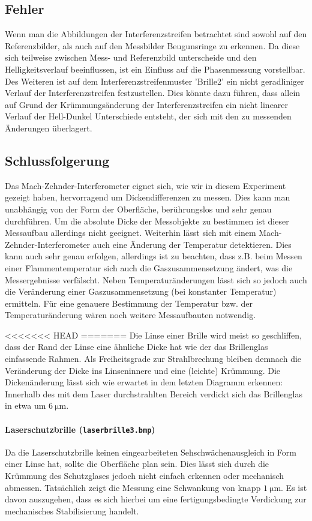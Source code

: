 \subsection{Fehler}
Wenn man die Abbildungen der Interferenzstreifen betrachtet sind sowohl auf den Referenzbilder, als auch auf den Messbilder Beugunsringe zu erkennen. Da diese sich teilweise zwischen Mess- und Referenzbild unterscheide und den Helligkeitsverlauf beeinflussen, ist ein Einfluss auf die Phasenmessung vorstellbar.
Des Weiteren ist auf dem Interferenzstreifenmuster 'Brille2' ein nicht geradliniger Verlauf der Interferenzstreifen festzustellen. Dies könnte dazu führen, dass allein auf Grund der Krümmungsänderung der Interferenzstreifen ein nicht linearer Verlauf der Hell-Dunkel Unterschiede entsteht, der sich mit den zu messenden Änderungen überlagert.


\subsection{Schlussfolgerung}
Das Mach-Zehnder-Interferometer eignet sich, wie wir in diesem Experiment gezeigt haben, hervorragend um Dickendifferenzen zu messen. Dies kann man unabhängig von der Form der Oberfläche, berührungslos und sehr genau durchführen. Um die absolute Dicke der Messobjekte zu bestimmen ist dieser Messaufbau allerdings nicht geeignet.
Weiterhin lässt sich mit einem Mach-Zehnder-Interferometer auch eine Änderung der Temperatur detektieren. Dies kann auch sehr genau erfolgen, allerdings ist zu beachten, dass z.B. beim Messen einer Flammentemperatur sich auch die Gaszusammensetzung ändert, was die Messergebnisse verfälscht. 
Neben Temperaturänderungen lässt sich so jedoch auch die Veränderung einer Gaszusammensetzung (bei konstanter Temperatur) ermitteln. Für eine genauere Bestimmung der Temperatur bzw. der Temperaturänderung wären noch weitere Messaufbauten notwendig.  

<<<<<<< HEAD
=======
Die Linse einer Brille wird meist so geschliffen, dass der Rand der Linse eine ähnliche Dicke hat wie der das Brillenglas einfassende Rahmen. Als Freiheitsgrade zur Strahlbrechung bleiben demnach die Veränderung der Dicke ins Linseninnere und eine (leichte) Krümmung.
Die Dickenänderung lässt sich wie erwartet in dem letzten Diagramm erkennen: Innerhalb des mit dem Laser durchstrahlten Bereich verdickt sich das Brillenglas in etwa um $\SI{6}{\micro\meter}$.
 
\paragraph*{Laserschutzbrille (\texttt{laserbrille3.bmp})}
Da die Laserschutzbrille keinen eingearbeiteten Sehschwächenausgleich in Form einer Linse hat, sollte die Oberfläche plan sein. Dies lässt sich durch die Krümmung des Schutzglases jedoch nicht einfach erkennen oder mechanisch abmessen. 
Tatsächlich zeigt die Messung eine Schwankung von knapp $\SI{1}{\micro\meter}$. Es ist davon auszugehen, dass es sich hierbei um eine fertigungsbedingte Verdickung zur mechanisches Stabilisierung handelt.

